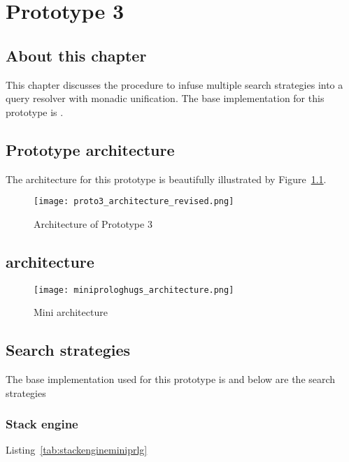 \documentclass[thesis-solanki.tex]{files}
\begin{document}
\chapter{Prototype 3}{\label{proto3}}


\section{About this chapter}
This chapter discusses the procedure to infuse multiple search strategies into a  query resolver with monadic unification. 
The base implementation for this prototype is  \cite{website:mini-prolog-hugs98}.

\section{Prototype architecture}
The architecture for this prototype is beautifully illustrated by Figure~\ref{fig:architecture-proto-3}. 

\begin{figure}[H]
  \texttt{[image: proto3\_architecture\_revised.png]}
\vspace*{-1cm}
  \caption{Architecture of Prototype 3}
  \label{fig:architecture-proto-3}
\end{figure}


\section{ \cite{website:mini-prolog-hugs98} architecture}

\begin{figure}[H]
	\centering
  \texttt{[image: miniprologhugs\_architecture.png]}
  \caption{Mini  architecture}
  \label{fig:miniprlgarchitecture}
\end{figure}

\section{Search strategies}
The base implementation used for this prototype is \cite{website:mini-prolog-hugs98} and below are the search
strategies
\subsection{Stack engine}
Listing~\ref{tab:stackengineminiprlg}
\end{document}
